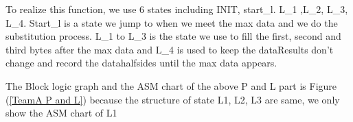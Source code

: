 \documentclass[11pt,a4paper]{report}
\begin{document}
To realize this function, we use 6 states including INIT, start\_l. L\_1 ,L\_2, L\_3, L\_4. Start\_l is a state we jump
 to when we meet the max data and we do the substitution process. L\_1 to L\_3 is the state we use to fill the first, 
 second and third bytes after the max data and L\_4 is used to keep the dataResults don’t change and record the 
 datahalfsides until the max data appears.

The Block logic graph and the ASM chart of the above P and L part is Figure (\ref{TeamA P and L})
because the structure of state L1, L2, L3 are same, we only show the ASM chart of L1

\begin{figure}[!ht]
    \centering
    \quad
    \quad
\end{figure}
\end{document}
